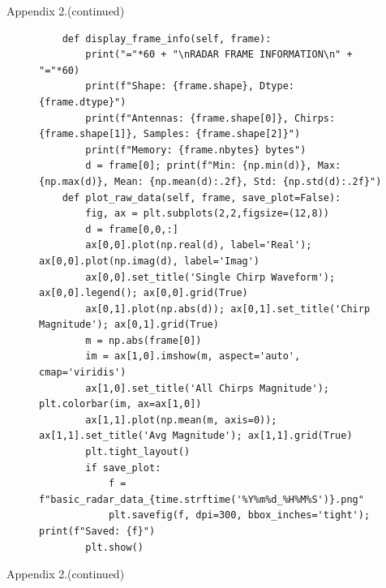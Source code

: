 \newpage
\hfill \large Appendix 2.(continued)

\begin{figure}[H]
\centering
\begin{verbatim}
    def display_frame_info(self, frame):
        print("="*60 + "\nRADAR FRAME INFORMATION\n" + "="*60)
        print(f"Shape: {frame.shape}, Dtype: {frame.dtype}")
        print(f"Antennas: {frame.shape[0]}, Chirps: {frame.shape[1]}, Samples: {frame.shape[2]}")
        print(f"Memory: {frame.nbytes} bytes")
        d = frame[0]; print(f"Min: {np.min(d)}, Max: {np.max(d)}, Mean: {np.mean(d):.2f}, Std: {np.std(d):.2f}")
    def plot_raw_data(self, frame, save_plot=False):
        fig, ax = plt.subplots(2,2,figsize=(12,8))
        d = frame[0,0,:]
        ax[0,0].plot(np.real(d), label='Real'); ax[0,0].plot(np.imag(d), label='Imag')
        ax[0,0].set_title('Single Chirp Waveform'); ax[0,0].legend(); ax[0,0].grid(True)
        ax[0,1].plot(np.abs(d)); ax[0,1].set_title('Chirp Magnitude'); ax[0,1].grid(True)
        m = np.abs(frame[0])
        im = ax[1,0].imshow(m, aspect='auto', cmap='viridis')
        ax[1,0].set_title('All Chirps Magnitude'); plt.colorbar(im, ax=ax[1,0])
        ax[1,1].plot(np.mean(m, axis=0)); ax[1,1].set_title('Avg Magnitude'); ax[1,1].grid(True)
        plt.tight_layout()
        if save_plot:
            f = f"basic_radar_data_{time.strftime('%Y%m%d_%H%M%S')}.png"
            plt.savefig(f, dpi=300, bbox_inches='tight'); print(f"Saved: {f}")
        plt.show()
\end{verbatim}
\end{figure}

\newpage
\hfill \large Appendix 2.(continued)

